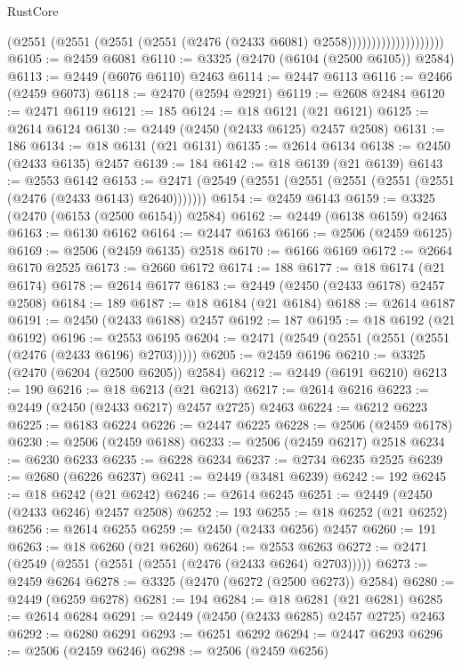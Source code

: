 \begin{lexlean}{RustCore}
\begin{coremodule}
                                  (@2551
                                    (@2551
                                      (@2551 (@2551 (@2476 (@2433 @6081) @2558))))))))))))))))))))
@6105 := @2459 @6081
@6110 := @3325 (@2470 (@6104 (@2500 @6105)) @2584)
@6113 := @2449 (@6076 @6110) @2463
@6114 := @2447 @6113
@6116 := @2466 (@2459 @6073)
@6118 := @2470 (@2594 @2921)
@6119 := @2608 @2484
@6120 := @2471 @6119
@6121 := 185
@6124 := @18 @6121 (@21 @6121)
@6125 := @2614 @6124
@6130 := @2449 (@2450 (@2433 @6125) @2457 @2508)
@6131 := 186
@6134 := @18 @6131 (@21 @6131)
@6135 := @2614 @6134
@6138 := @2450 (@2433 @6135) @2457
@6139 := 184
@6142 := @18 @6139 (@21 @6139)
@6143 := @2553 @6142
@6153 := @2471 (@2549 (@2551 (@2551 (@2551 (@2551 (@2551 (@2476 (@2433 @6143) @2640)))))))
@6154 := @2459 @6143
@6159 := @3325 (@2470 (@6153 (@2500 @6154)) @2584)
@6162 := @2449 (@6138 @6159) @2463
@6163 := @6130 @6162
@6164 := @2447 @6163
@6166 := @2506 (@2459 @6125)
@6169 := @2506 (@2459 @6135) @2518
@6170 := @6166 @6169
@6172 := @2664 @6170 @2525
@6173 := @2660 @6172
@6174 := 188
@6177 := @18 @6174 (@21 @6174)
@6178 := @2614 @6177
@6183 := @2449 (@2450 (@2433 @6178) @2457 @2508)
@6184 := 189
@6187 := @18 @6184 (@21 @6184)
@6188 := @2614 @6187
@6191 := @2450 (@2433 @6188) @2457
@6192 := 187
@6195 := @18 @6192 (@21 @6192)
@6196 := @2553 @6195
@6204 := @2471 (@2549 (@2551 (@2551 (@2551 (@2476 (@2433 @6196) @2703)))))
@6205 := @2459 @6196
@6210 := @3325 (@2470 (@6204 (@2500 @6205)) @2584)
@6212 := @2449 (@6191 @6210)
@6213 := 190
@6216 := @18 @6213 (@21 @6213)
@6217 := @2614 @6216
@6223 := @2449 (@2450 (@2433 @6217) @2457 @2725) @2463
@6224 := @6212 @6223
@6225 := @6183 @6224
@6226 := @2447 @6225
@6228 := @2506 (@2459 @6178)
@6230 := @2506 (@2459 @6188)
@6233 := @2506 (@2459 @6217) @2518
@6234 := @6230 @6233
@6235 := @6228 @6234
@6237 := @2734 @6235 @2525
@6239 := @2680 (@6226 @6237)
@6241 := @2449 (@3481 @6239)
@6242 := 192
@6245 := @18 @6242 (@21 @6242)
@6246 := @2614 @6245
@6251 := @2449 (@2450 (@2433 @6246) @2457 @2508)
@6252 := 193
@6255 := @18 @6252 (@21 @6252)
@6256 := @2614 @6255
@6259 := @2450 (@2433 @6256) @2457
@6260 := 191
@6263 := @18 @6260 (@21 @6260)
@6264 := @2553 @6263
@6272 := @2471 (@2549 (@2551 (@2551 (@2551 (@2476 (@2433 @6264) @2703)))))
@6273 := @2459 @6264
@6278 := @3325 (@2470 (@6272 (@2500 @6273)) @2584)
@6280 := @2449 (@6259 @6278)
@6281 := 194
@6284 := @18 @6281 (@21 @6281)
@6285 := @2614 @6284
@6291 := @2449 (@2450 (@2433 @6285) @2457 @2725) @2463
@6292 := @6280 @6291
@6293 := @6251 @6292
@6294 := @2447 @6293
@6296 := @2506 (@2459 @6246)
@6298 := @2506 (@2459 @6256)

\end{coremodule}
\end{lexlean}
